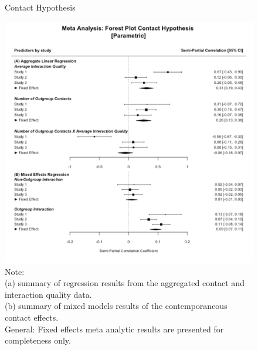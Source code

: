 \documentclass[man, 12pt, a4paper, mask]{apa7}
\theoremstyle{break}
\theoremstyle{plain}
\begin{document}
\begin{figure}
  \caption{Contact Hypothesis}
  \label{fig:ContactHypothesis}
  \centering\includegraphics[width=\textwidth]{Figures/forestParametricGeneralComb.png}
  \caption*{Note: \\
  (a) summary of regression results from the aggregated contact and interaction quality data.\\
  (b) summary of mixed models results of the contemporaneous contact effects.\\
  General: Fixed effects meta analytic results are presented for completeness only.}
\end{figure}
\end{document}
